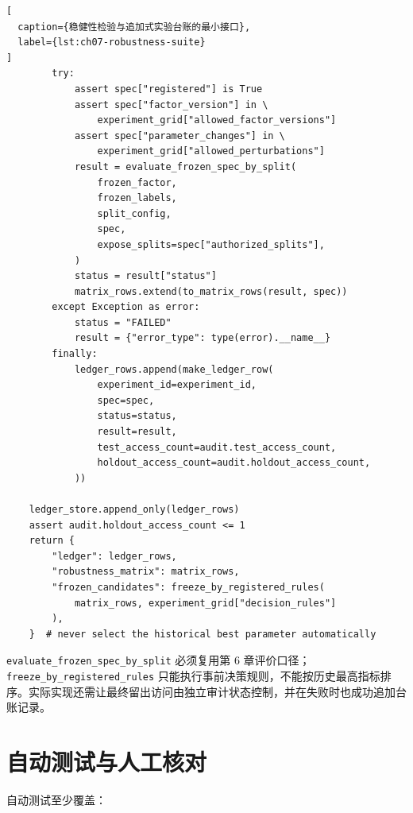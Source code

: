 \begin{lstlisting}[
  caption={稳健性检验与追加式实验台账的最小接口},
  label={lst:ch07-robustness-suite}
]
        try:
            assert spec["registered"] is True
            assert spec["factor_version"] in \
                experiment_grid["allowed_factor_versions"]
            assert spec["parameter_changes"] in \
                experiment_grid["allowed_perturbations"]
            result = evaluate_frozen_spec_by_split(
                frozen_factor,
                frozen_labels,
                split_config,
                spec,
                expose_splits=spec["authorized_splits"],
            )
            status = result["status"]
            matrix_rows.extend(to_matrix_rows(result, spec))
        except Exception as error:
            status = "FAILED"
            result = {"error_type": type(error).__name__}
        finally:
            ledger_rows.append(make_ledger_row(
                experiment_id=experiment_id,
                spec=spec,
                status=status,
                result=result,
                test_access_count=audit.test_access_count,
                holdout_access_count=audit.holdout_access_count,
            ))

    ledger_store.append_only(ledger_rows)
    assert audit.holdout_access_count <= 1
    return {
        "ledger": ledger_rows,
        "robustness_matrix": matrix_rows,
        "frozen_candidates": freeze_by_registered_rules(
            matrix_rows, experiment_grid["decision_rules"]
        ),
    }  # never select the historical best parameter automatically
\end{lstlisting}

\texttt{evaluate\_frozen\_spec\_by\_split} 必须复用第 6 章评价口径；\texttt{freeze\_by\_registered\_rules} 只能执行事前决策规则，不能按历史最高指标排序。实际实现还需让最终留出访问由独立审计状态控制，并在失败时也成功追加台账记录。

\section{自动测试与人工核对}

自动测试至少覆盖：

